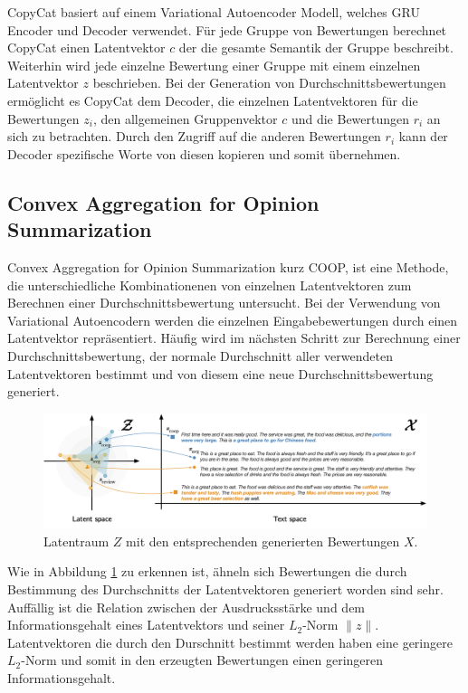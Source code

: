 CopyCat basiert auf einem Variational Autoencoder Modell, welches GRU Encoder und Decoder verwendet. 
Für jede Gruppe von Bewertungen berechnet CopyCat einen Latentvektor $c$ der die gesamte Semantik der Gruppe beschreibt. 
Weiterhin wird jede einzelne Bewertung einer Gruppe mit einem einzelnen Latentvektor $z$ beschrieben.
Bei der Generation von Durchschnittsbewertungen ermöglicht es CopyCat dem Decoder, die einzelnen Latentvektoren für die Bewertungen $z_i$, den allgemeinen Gruppenvektor $c$ und die Bewertungen $r_i$ an sich zu betrachten.
Durch den Zugriff auf die anderen Bewertungen $r_i$ kann der Decoder spezifische Worte von diesen \glqq kopieren\grqq{}  und somit übernehmen.



\subsection{Convex Aggregation for Opinion Summarization}
Convex Aggregation for Opinion Summarization kurz COOP, ist eine Methode, die unterschiedliche Kombinationenen von einzelnen Latentvektoren zum Berechnen einer Durchschnittsbewertung untersucht.
Bei der Verwendung von Variational Autoencodern werden die einzelnen Eingabebewertungen durch einen Latentvektor repräsentiert. 
Häufig wird im nächsten Schritt zur Berechnung einer Durchschnittsbewertung, der normale Durchschnitt aller verwendeten Latentvektoren bestimmt und von diesem eine neue Durchschnittsbewertung generiert.

\begin{figure}[h]
    \centering
    \includegraphics[width=\textwidth]{bilder/coop}
    \caption{Latentraum $Z$ mit den entsprechenden generierten Bewertungen $X$.}
    \label{coop_fig}
\end{figure}

Wie in Abbildung \ref{coop_fig} zu erkennen ist, ähneln sich Bewertungen die durch Bestimmung des Durchschnitts der Latentvektoren generiert worden sind sehr. 
Auffällig ist die Relation zwischen der Ausdrucksstärke und dem Informationsgehalt eines Latentvektors und seiner $L_2$-Norm $\| z \|$.
Latentvektoren die durch den Durschnitt bestimmt werden haben eine geringere $L_2$-Norm und somit in den erzeugten Bewertungen einen geringeren Informationsgehalt.

